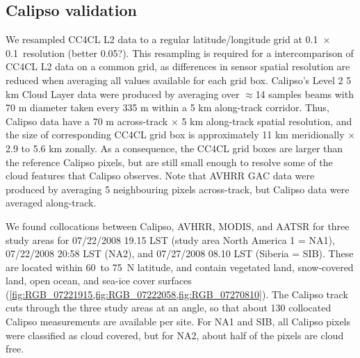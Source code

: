 \subsection{Calipso validation}\label{sec:calipso_method}

We resampled CC4CL L2 data to a regular latitude/longitude grid at 0.1\textdegree\ $\times$ 0.1\textdegree\ resolution (better 0.05?). This resampling is required for a intercomparison of CC4CL L2 data on a common grid, as differences in sensor spatial resolution are reduced when averaging all values available for each grid box. Calipso's Level 2 5 km Cloud Layer data were produced by averaging over $\approx$14 samples beams with 70 m diameter taken every 335 m within a 5 km along-track corridor. Thus, Calipso data have a 70 m across-track $\times$ 5 km along-track spatial resolution, and the size of corresponding CC4CL grid box is approximately 11 km meridionally $\times$ 2.9 to 5.6 km zonally. As a consequence, the CC4CL grid boxes are larger than the reference Calipso pixels, but are still small enough to resolve some of the cloud features that Calipso observes. Note that AVHRR GAC data were produced by averaging 5 neighbouring pixels across-track, but Calipso data were averaged along-track.

We found collocations between Calipso, AVHRR, MODIS, and AATSR for three study areas for 07/22/2008 19.15 LST (study area North America 1 = NA1), 07/22/2008 20:58 LST (NA2), and 07/27/2008 08.10 LST (Siberia = SIB). These are located within 60\textdegree\ to 75\textdegree\ N latitude, and contain vegetated land, snow-covered land, open ocean, and sea-ice cover surfaces (\cref{fig:RGB_07221915,fig:RGB_07222058,fig:RGB_07270810}). The Calipso track cuts through the three study areas at an angle, so that about 130 collocated Calipso measurements are available per site. For NA1 and SIB, all Calipso pixels were classified as cloud covered, but for NA2, about half of the pixels are cloud free.

